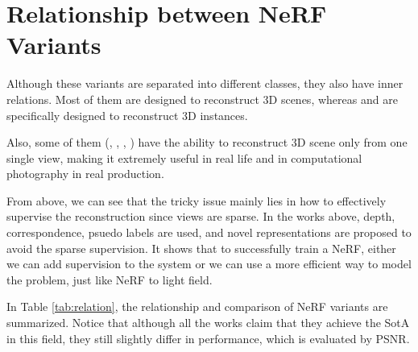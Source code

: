 \documentclass[10pt,twocolumn,letterpaper]{article}
\begin{document}
\section{Relationship between NeRF Variants}

Although these variants are separated into different classes, they also have inner relations. Most of them are designed to reconstruct 3D scenes, whereas \cite{SRF} and \cite{mueller2022autorf} are specifically designed to reconstruct 3D instances.

Also, some of them (\cite{yu2020pixelnerf}, \cite{lin2023visionnerf}, \cite{mueller2022autorf}, \cite{Xu_2022_SinNeRF}) have the ability to reconstruct 3D scene only from one single view, making it extremely useful in real life and in computational photography in real production.

From above, we can see that the tricky issue mainly lies in how to effectively supervise the reconstruction since views are sparse. In the works above, depth, correspondence, psuedo labels are used, and novel representations are proposed to avoid the sparse supervision. It shows that to successfully train a NeRF, either we can add supervision to the system or we can use a more efficient way to model the problem, just like NeRF to light field.

In Table \ref{tab:relation}, the relationship and comparison of NeRF variants are summarized. Notice that although all the works claim that they achieve the SotA in this field, they still slightly differ in performance, which is evaluated by PSNR.
\end{document}
